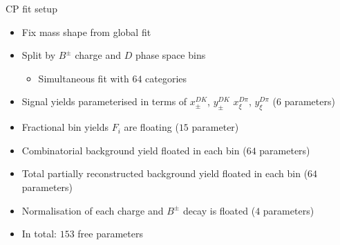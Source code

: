 \documentclass{beamer}
\begin{document}
\begin{frame}{CP fit setup}
  \begin{itemize}
    \item{Fix mass shape from global fit}
    \item{Split by $B^\pm$ charge and $D$ phase space bins}
    \begin{itemize}
      \item{Simultaneous fit with $64$ categories}
    \end{itemize}
    \item{Signal yields parameterised in terms of $x_\pm^{DK}$, $y_\pm^{DK}$ $x_\xi^{D\pi}$, $y_\xi^{D\pi}$ ($6$ parameters)}
    \item{Fractional bin yields $F_i$ are floating ($15$ parameter)}
    \item{Combinatorial background yield floated in each bin ($64$ parameters)}
    \item{Total partially reconstructed background yield floated in each bin ($64$ parameters)}
    \item{Normalisation of each charge and $B^\pm$ decay is floated ($4$ parameters)}
    \item{In total: $153$ free parameters}
  \end{itemize}
\end{frame}
\end{document}
